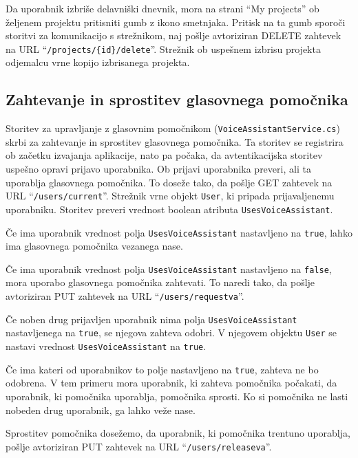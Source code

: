 \documentclass[a4paper, 12pt]{book}
\begin{document}
Da uporabnik izbriše delavniški dnevnik, mora na strani \enquote{My projects} ob željenem projektu pritisniti gumb z ikono smetnjaka.
Pritisk na ta gumb sporoči storitvi za komunikacijo s strežnikom, naj pošlje avtoriziran DELETE zahtevek na URL \enquote{\texttt{/projects/\{id\}/delete}}.
Strežnik ob uspešnem izbrisu projekta odjemalcu vrne kopijo izbrisanega projekta.

\subsection{Zahtevanje in sprostitev glasovnega pomočnika}
Storitev za upravljanje z glasovnim pomočnikom (\texttt{VoiceAssistantService.cs}) skrbi za zahtevanje in sprostitev glasovnega pomočnika.
Ta storitev se registrira ob začetku izvajanja aplikacije, nato pa počaka, da avtentikacijska storitev uspešno opravi prijavo uporabnika.
Ob prijavi uporabnika preveri, ali ta uporablja glasovnega pomočnika.
To doseže tako, da pošlje GET zahtevek na URL \enquote{\texttt{/users/current}}.
Strežnik vrne objekt \texttt{User}, ki pripada prijavaljenemu uporabniku.
Storitev preveri vrednost boolean atributa \texttt{UsesVoiceAssistant}.

Če ima uporabnik vrednost polja \texttt{UsesVoiceAssistant} nastavljeno na \texttt{true}, lahko ima glasovnega pomočnika vezanega nase.

Če ima uporabnik vrednost polja \texttt{UsesVoiceAssistant} nastavljeno na \texttt{false}, mora uporabo glasovnega pomočnika zahtevati.
To naredi tako, da pošlje avtoriziran PUT zahtevek na URL \enquote{\texttt{/users/requestva}}.

Če noben drug prijavljen uporabnik nima polja \texttt{UsesVoiceAssistant} nastavljenega na \texttt{true}, se njegova zahteva odobri.
V njegovem objektu \texttt{User} se nastavi vrednost \texttt{UsesVoiceAssistant} na \texttt{true}.

Če ima kateri od uporabnikov to polje nastavljeno na \texttt{true}, zahteva ne bo odobrena.
V tem primeru mora uporabnik, ki zahteva pomočnika počakati, da uporabnik, ki pomočnika uporablja, pomočnika sprosti.
Ko si pomočnika ne lasti nobeden drug uporabnik, ga lahko veže nase.

Sprostitev pomočnika dosežemo, da uporabnik, ki pomočnika trentuno uporablja, pošlje avtoriziran PUT zahtevek na URL \enquote{\texttt{/users/releaseva}}.
\end{document}
